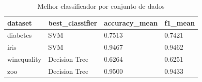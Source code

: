\begin{table}[htbp]
\centering
\begin{tabular}{llll}
\hline
dataset & best\_classifier & accuracy\_mean & f1\_mean \\
\hline
diabetes & SVM & 0.7513 & 0.7421 \\
iris & SVM & 0.9467 & 0.9462 \\
winequality & Decision Tree & 0.6264 & 0.6251 \\
zoo & Decision Tree & 0.9500 & 0.9433 \\
\hline
\end{tabular}
\caption{Melhor classificador por conjunto de dados}
\label{tab:ex3-best-classifiers}
\end{table}